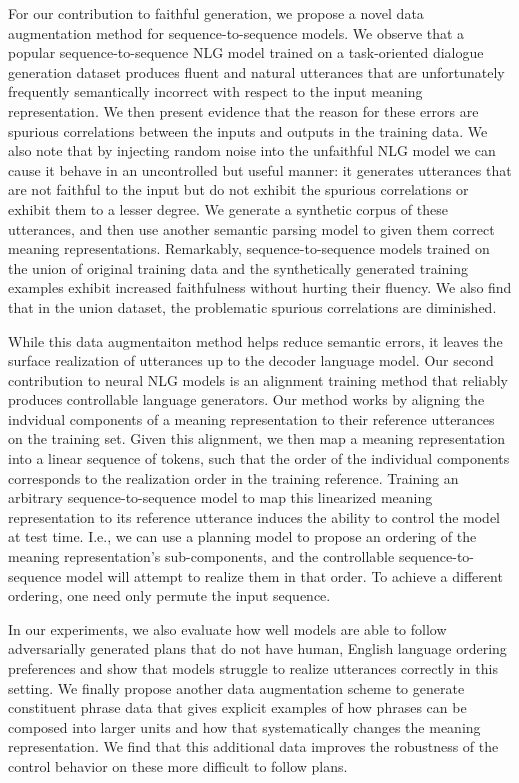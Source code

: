 For our contribution to faithful generation, we propose a novel data
augmentation method for sequence-to-sequence models.  We observe that a
popular sequence-to-sequence NLG model trained on a task-oriented dialogue
generation dataset produces fluent and natural utterances that are
unfortunately frequently semantically incorrect with respect to the input
meaning representation.  We then present evidence that the reason for these
errors are spurious correlations between the inputs and outputs in the
training data.  We also note that by injecting random noise into the
unfaithful NLG model we can cause it behave in an uncontrolled but useful
manner: it generates utterances that are not faithful to the input but do not
exhibit the spurious correlations or exhibit them to a lesser degree.  We
generate a synthetic corpus of these utterances, and then use another semantic
parsing model to given them correct meaning representations.  Remarkably,
sequence-to-sequence models trained on the union of original training data and
the synthetically generated training examples exhibit increased faithfulness
without hurting their fluency. We also find that in the union dataset, the
problematic spurious correlations are diminished.

While this data augmentaiton method helps reduce semantic errors, it leaves
the surface realization of utterances up to the decoder language model.  Our
second contribution to neural NLG models is an alignment training method that
reliably produces controllable language generators. Our method works by
aligning the indvidual components of a meaning representation to their
reference utterances on the training set. Given this alignment, we then map a
meaning representation into a linear sequence of tokens, such that the order
of the individual components corresponds to the realization order in the
training reference. Training an arbitrary sequence-to-sequence model to map
this linearized meaning representation to its reference utterance induces the
ability to control the model at test time. I.e., we can use a planning model
to propose an ordering of the meaning representation's sub-components, and the
controllable sequence-to-sequence model will attempt to realize them in that
order.  To achieve a different ordering, one need only permute the input
sequence.

In our experiments, we also evaluate how well models are able to follow
adversarially generated plans that do not have human, English language
ordering preferences and show that models struggle to realize utterances
correctly in this setting. We finally propose another data augmentation scheme
to generate constituent phrase data that gives explicit examples of how
phrases can be composed into larger units and how that systematically changes
the meaning representation. We find that this additional data improves the
robustness of the control behavior on these more difficult to follow plans.
